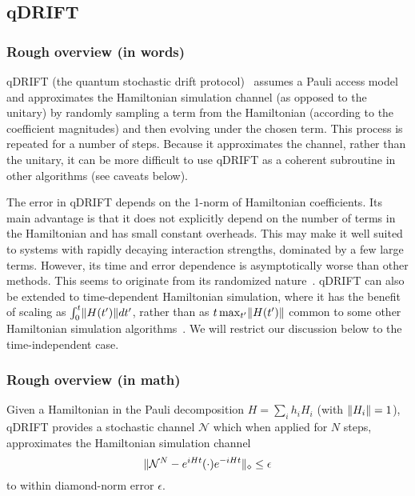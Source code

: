 \begin{refsection}


\subsection{qDRIFT}\label{prim:qDrift}

\subsubsection*{Rough overview (in words)}
qDRIFT (the quantum stochastic drift protocol)~\cite{campbell2019randomCompiler} assumes a Pauli access model and approximates the Hamiltonian simulation channel (as opposed to the unitary) by randomly sampling a term from the Hamiltonian (according to the coefficient magnitudes) and then evolving under the chosen term. This process is repeated for a number of steps. Because it approximates the channel, rather than the unitary, it can be more difficult to use qDRIFT as a coherent subroutine in other algorithms (see caveats below).

The error in qDRIFT depends on the 1-norm of Hamiltonian coefficients. Its main advantage is that it does not explicitly depend on the number of terms in the Hamiltonian and has small constant overheads. This may make it well suited to systems with rapidly decaying interaction strengths, dominated by a few large terms. However, its time and error dependence is asymptotically worse than other methods. This seems to originate from its randomized nature~\cite{chen2021conRandomProduct}. qDRIFT can also be extended to time-dependent Hamiltonian simulation, where it has the benefit of scaling as $\int_0^t \lVert H(t')\rVert dt'$, rather than as $t \max_{t'} \lVert H(t')\rVert$ common to some other Hamiltonian simulation algorithms~\cite{berry2019TimeDependentHamSimL1}. We will restrict our discussion below to the time-independent case.





\subsubsection*{Rough overview (in math)}

Given a Hamiltonian in the Pauli decomposition $H = \sum_i h_i H_i$ (with $\lVert H_i\rVert=1$), qDRIFT provides a stochastic channel $\mathcal{N}$ which when applied for $N$ steps, approximates the Hamiltonian simulation channel
\begin{equation}
    \lVert\mathcal{N}^N - e^{iHt} (\cdot)e^{-iHt}\rVert_{\diamond} \le \epsilon
\end{equation}
to within diamond-norm error $\epsilon$. 


\end{refsection}
